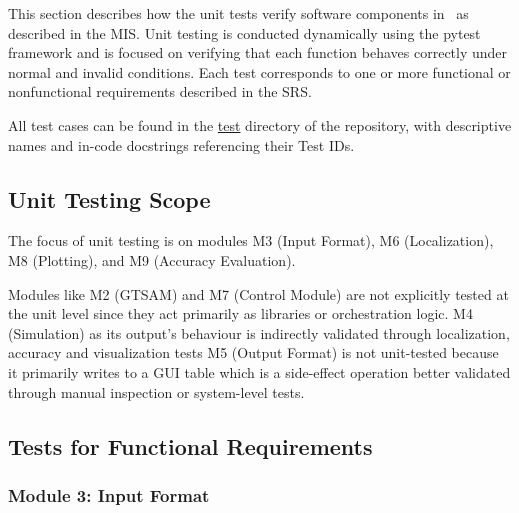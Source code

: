 \documentclass[12pt, titlepage]{article}
\begin{document}
This section describes how the unit tests verify software components in \progname~as described in the MIS. Unit testing is conducted dynamically using the pytest framework and is focused on verifying that each function behaves correctly under normal and invalid conditions. Each test corresponds to one or more functional or nonfunctional requirements described in the SRS.

All test cases can be found in the \hyperlink{https://github.com/AliyahJimoh/2D-Localizer/tree/main/test}{test} directory of the repository, with descriptive names and in-code docstrings referencing their Test IDs.

\subsection{Unit Testing Scope}


The focus of unit testing is on modules M3 (Input Format), M6 (Localization), M8 (Plotting), and M9 (Accuracy Evaluation).

Modules like M2 (GTSAM) and M7 (Control Module) are not explicitly tested at the unit level since they act primarily as libraries or orchestration logic. M4 (Simulation) as its output's behaviour is indirectly validated through localization, accuracy and visualization tests M5 (Output Format) is not unit-tested because it primarily writes to a GUI table which is a side-effect operation better validated through manual inspection or system-level tests.

\subsection{Tests for Functional Requirements}


\subsubsection{Module 3: Input Format}
\end{document}
